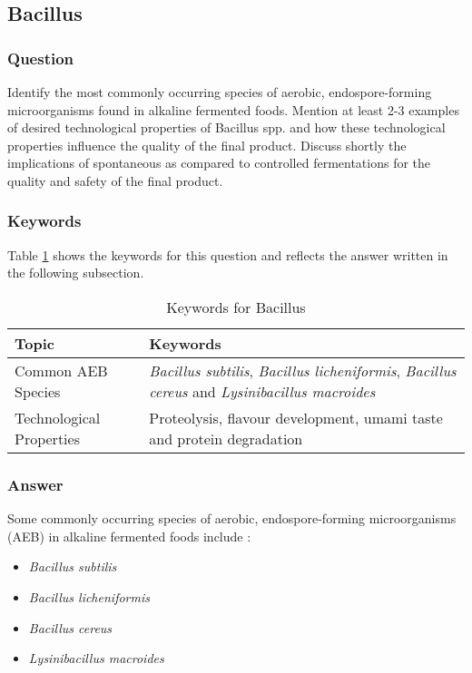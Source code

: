 \subsection{Bacillus}
\subsubsection*{Question}
Identify the most commonly occurring species of aerobic, endospore-forming microorganisms found in alkaline fermented foods. Mention at least 2-3 examples of desired technological properties of Bacillus spp. and how these technological properties influence the quality of the final product. Discuss shortly the implications of spontaneous as compared to controlled fermentations for the quality and safety of the final product.  

\subsubsection*{Keywords}
Table \ref{tab:KW-Bacillus} shows the keywords for this question and reflects the answer written in the following subsection.
\begin{table}[h]
    \centering
    \caption{Keywords for Bacillus}
    \label{tab:KW-Bacillus}
    \begin{tabular}{l|l}
        \textbf{Topic} & \textbf{Keywords} \\
        \hline
        Common AEB Species & \textit{Bacillus subtilis}, \textit{Bacillus licheniformis}, \textit{Bacillus cereus} and \textit{Lysinibacillus macroides}\\
        Technological Properties & Proteolysis, flavour development, umami taste and protein degradation\\
    \end{tabular}
\end{table}


\subsubsection*{Answer}
Some commonly occurring species of aerobic, endospore-forming microorganisms (AEB) in alkaline fermented foods include \cite*{L8-ImpQuorum}:
\begin{itemize}
    \item \textit{Bacillus subtilis}
    \item \textit{Bacillus licheniformis}
    \item \textit{Bacillus cereus}
    \item \textit{Lysinibacillus macroides}
\end{itemize}

